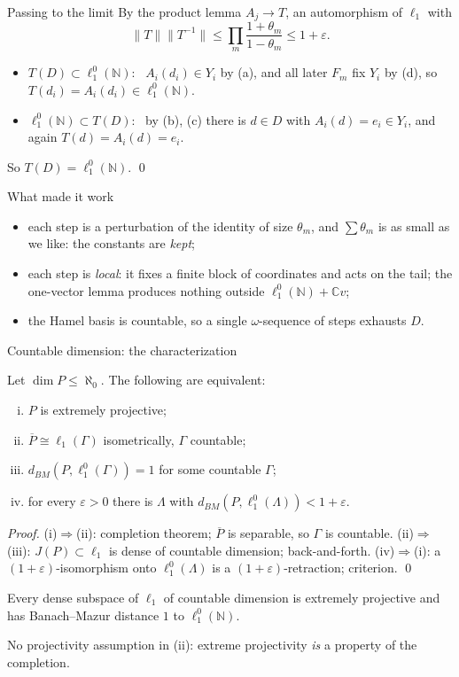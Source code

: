 \documentclass[10pt,aspectratio=169]{beamer}
\newcommand{\lo}[1]{\ell_1^0(#1)}
\newcommand{\ellone}[1]{\ell_1(#1)}
\newcommand{\BM}{d_{BM}}
\newcommand{\NN}{\mathbb N}
\newcommand{\CC}{\mathbb C}
\begin{document}
\begin{frame}{Passing to the limit}
  By the product lemma $A_j\to T$, an automorphism of $\ell_1$ with
  \[
    \|T\|\|T^{-1}\|\le\prod_m\frac{1+\theta_m}{1-\theta_m}\le1+\varepsilon .
  \]
  \begin{itemize}
    \item $T(D)\subset\lo\NN$: \ $A_i(d_i)\in Y_i$ by (a), and all later $F_m$
      fix $Y_i$ by (d), so $T(d_i)=A_i(d_i)\in\lo\NN$.
    \item $\lo\NN\subset T(D)$: \ by (b), (c) there is $d\in D$ with
      $A_i(d)=e_i\in Y_i$, and again $T(d)=A_i(d)=e_i$.
  \end{itemize}
  So $T(D)=\lo\NN$. \qed
  \begin{alertblock}{What made it work}
    \begin{itemize}
      \item each step is a perturbation of the identity of size $\theta_m$, and
        $\sum\theta_m$ is as small as we like: the constants are \emph{kept};
      \item each step is \emph{local}: it fixes a finite block of coordinates and
        acts on the tail; the one-vector lemma produces nothing outside
        $\lo\NN+\CC v$;
      \item the Hamel basis is countable, so a single $\omega$-sequence of steps
        exhausts $D$.
    \end{itemize}
  \end{alertblock}
\end{frame}

\begin{frame}{Countable dimension: the characterization}
  \begin{theorem}
    Let $\dim P\le\aleph_0$. The following are equivalent:
    \begin{enumerate}[(i)]
      \item $P$ is extremely projective;
      \item $\overline P\cong\ellone\Gamma$ isometrically, $\Gamma$ countable;
      \item $\BM(P,\lo\Gamma)=1$ for some countable $\Gamma$;
      \item for every $\varepsilon>0$ there is $\Lambda$ with $\BM(P,\lo\Lambda)<1+\varepsilon$.
    \end{enumerate}
  \end{theorem}
  \textit{Proof.} (i)$\Rightarrow$(ii): completion theorem; $\overline P$ is
  separable, so $\Gamma$ is countable.
  (ii)$\Rightarrow$(iii): $J(P)\subset\ell_1$ is dense of countable dimension;
  back-and-forth.
  (iv)$\Rightarrow$(i): a $(1+\varepsilon)$-isomorphism onto $\lo\Lambda$ is a
  $(1+\varepsilon)$-retraction; criterion. \qed
  \begin{corollary}
    Every dense subspace of $\ell_1$ of countable dimension is extremely
    projective and has Banach--Mazur distance $1$ to $\lo\NN$.
  \end{corollary}
  No projectivity assumption in (ii): extreme projectivity \emph{is} a
  property of the completion.
\end{frame}
\end{document}
